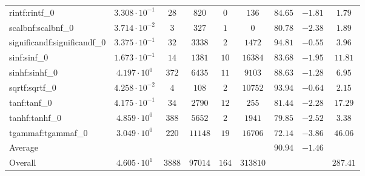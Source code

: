 \begin{tabular}{|l|c|c|c|c|c|c|c|c|}
rintf:rintf\_0               & $ 3.308 \cdot 10^{-1} $ & $ 28     $ & $ 820   $ & $ 0   $ & $ 136    $ & $ 84.65       $ & $ -1.81   $ & $ 1.79    $ \\
scalbnf:scalbnf\_0           & $ 3.714 \cdot 10^{-2} $ & $ 3      $ & $ 327   $ & $ 1   $ & $ 0      $ & $ 80.78       $ & $ -2.38   $ & $ 1.89    $ \\
significandf:significandf\_0 & $ 3.375 \cdot 10^{-1} $ & $ 32     $ & $ 3338  $ & $ 2   $ & $ 1472   $ & $ 94.81       $ & $ -0.55   $ & $ 3.96    $ \\
sinf:sinf\_0                 & $ 1.673 \cdot 10^{-1} $ & $ 14     $ & $ 1381  $ & $ 10  $ & $ 16384  $ & $ 83.68       $ & $ -1.95   $ & $ 11.81   $ \\
sinhf:sinhf\_0               & $ 4.197 \cdot 10^{0}  $ & $ 372    $ & $ 6435  $ & $ 11  $ & $ 9103   $ & $ 88.63       $ & $ -1.28   $ & $ 6.95    $ \\
sqrtf:sqrtf\_0               & $ 4.258 \cdot 10^{-2} $ & $ 4      $ & $ 108   $ & $ 2   $ & $ 10752  $ & $ 93.94       $ & $ -0.64   $ & $ 2.15    $ \\
tanf:tanf\_0                 & $ 4.175 \cdot 10^{-1} $ & $ 34     $ & $ 2790  $ & $ 12  $ & $ 255    $ & $ 81.44       $ & $ -2.28   $ & $ 17.29   $ \\
tanhf:tanhf\_0               & $ 4.859 \cdot 10^{0}  $ & $ 388    $ & $ 5652  $ & $ 2   $ & $ 1941   $ & $ 79.85       $ & $ -2.52   $ & $ 3.38    $ \\
tgammaf:tgammaf\_0           & $ 3.049 \cdot 10^{0}  $ & $ 220    $ & $ 11148 $ & $ 19  $ & $ 16706  $ & $ 72.14       $ & $ -3.86   $ & $ 46.06   $ \\
\hline
Average                      & $                     $ & $        $ & $       $ & $     $ & $        $ & $ 90.94       $ & $ -1.46   $ & $         $ \\
\hline
Overall                      & $ 4.605 \cdot 10^{1}  $ & $ 3888   $ & $ 97014 $ & $ 164 $ & $ 313810 $ & $             $ & $         $ & $ 287.41  $ \\
\hline
\end{tabular}
